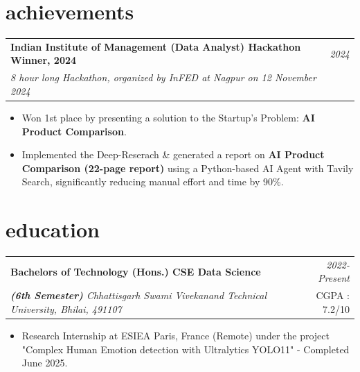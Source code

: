 \documentclass[a4paper,11pt]{article}
\makeatletter
\newcommand{\resumeProject}[4]{
\vspace{0.5mm}\item
    \begin{tabular*}{0.98\textwidth}[t]{l@{\extracolsep{\fill}}r}
        \textbf{#1} & \textit{\footnotesize{#3}} \\
        \footnotesize{\textit{#2}} & \footnotesize{#4}
    \end{tabular*}
    \vspace{-2.4mm}
}
\newcommand{\resumeSubHeadingListStart}{\begin{itemize}[leftmargin=*,labelsep=0mm]}
\newcommand{\resumeItemListStart}{\begin{justify}\begin{itemize}[leftmargin=3ex, rightmargin=2ex, noitemsep,labelsep=1.2mm,itemsep=0mm]\small}
\newcommand{\resumeItemListEnd}{\end{itemize}\end{justify}\vspace{-2mm}}
\makeatother
\begin{document}
\section{\textbf{achievements}}
\vspace{-0.4mm}
% 
\vspace{-0.4mm}
\resumeProject
  {Indian Institute of Management (Data Analyst) Hackathon Winner, 2024}
  {8 hour long Hackathon, organized by InFED at Nagpur on 12 November 2024}
  {2024}
  {{}\href{https://xpdv.github.io/assets/pdf/win.jpg}{\textcolor{darkblue}{\faIcon{globe}}}}
\resumeItemListStart
  \item Won 1st place by presenting a solution to the Startup's Problem: \textbf{AI Product Comparison}.
  \item Implemented the Deep-Reserach \& generated a report on \textbf{AI Product Comparison (22-page report)} using a Python-based AI Agent with Tavily Search, significantly reducing manual effort and time by 90\%.
\resumeItemListEnd

\vspace{-1mm}

\section{\textbf{education}}
\resumeProject
      {Bachelors of Technology (Hons.) CSE Data Science}
      {\textbf{(6th Semester)} Chhattisgarh Swami Vivekanand Technical University, Bhilai, 491107}
      {2022-Present}
      {CGPA : 7.2/10}
\resumeItemListStart
    \item Research Internship at ESIEA Paris, France (Remote) under the project "Complex Human Emotion detection with Ultralytics YOLO11" - Completed June 2025.
\resumeItemListEnd

\vspace{-5.5mm}

  
\end{document}
